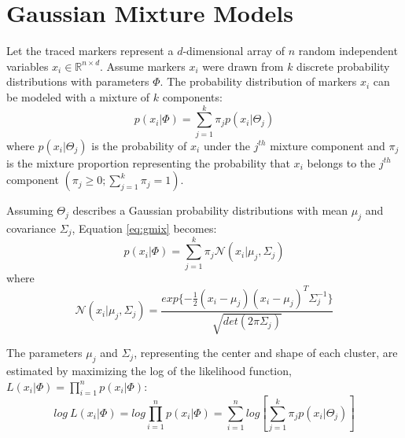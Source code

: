 \hypertarget{gmm}{%
\section{Gaussian Mixture Models}\label{gmm}}

Let the traced markers represent a \(d\)-dimensional array of \(n\) random independent variables \(x_i \in \mathbb{R}^{n \times d}\). Assume markers \(x_i\) were drawn from \(k\) discrete probability distributions with parameters \(\Phi\). The probability distribution of markers \(x_i\) can be modeled with a mixture of \(k\) components:
\begin{equation}
  p(x_i | \Phi) = \sum_{j=1}^k \pi_j p(x_i | \Theta_j)
  \label{eq:gmix}
\end{equation}
where \(p(x_i | \Theta_j)\) is the probability of \(x_i\) under the \(j^{th}\) mixture component and \(\pi_j\) is the mixture proportion representing the probability that \(x_i\) belongs to the \(j^{th}\) component \((\pi_j \geq 0; \sum_{j=1}^k \pi_j = 1)\).

Assuming \(\Theta_j\) describes a Gaussian probability distributions with mean \(\mu_j\) and covariance \(\Sigma_j\), Equation \eqref{eq:gmix} becomes:
\begin{equation}
  p(x_i | \Phi) = \sum_{j=1}^k \pi_j \mathcal{N}(x_i | \mu_j, \Sigma_j)
  \label{eq:mix}
\end{equation}
where
\begin{equation}
  \mathcal{N}(x_i | \mu_j, \Sigma_j) = \frac{exp\{ -\frac{1}{2}(x_i - \mu_j)(x_i - \mu_j)^T \Sigma_j^{-1}\}}{\sqrt{det(2 \pi \Sigma_j)}}
  \label{eq:gauss}
\end{equation}

The parameters \(\mu_j\) and \(\Sigma_j\), representing the center and shape of each cluster, are estimated by maximizing the log of the likelihood function, \(L(x_i | \Phi) = \prod_{i=1}^n p(x_i | \Phi)\):
\begin{equation}
  log~L(x_i | \Phi) = log \prod_{i=1}^n p(x_i | \Phi) = \sum_{i=1}^n log \left[ \sum_{j=1}^k \pi_j p(x_i | \Theta_j) \right]
  \label{eq:loglik}
\end{equation}

